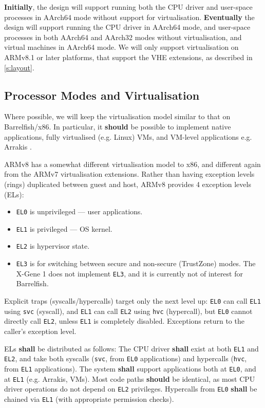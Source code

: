 \documentclass[a4paper,twoside]{report}
\begin{document}
\textbf{Initially}, the design will support running both the CPU driver and
user-space processes in AArch64 mode without support for virtualisation.
\textbf{Eventually} the design will support running the CPU driver in AArch64
mode, and user-space processes in both AArch64 and AArch32 modes without
virtualisation, and virtual machines in AArch64 mode. We will only support
virtualisation on ARMv8.1 or later platforms, that support the VHE extensions,
as described in \autoref{s:layout}.

\subsection{Processor Modes and Virtualisation}

Where possible, we will keep the virtualisation model similar to that on
Barrelfish/x86. In particular, it \textbf{should} be possible to implement
native applications, fully virtualised (e.g. Linux) VMs, and VM-level
applications e.g. Arrakis \citep{peter:osdi14}.

ARMv8 has a somewhat different virtualisation model to x86, and different
again from the ARMv7 virtualisation extensions. Rather than having exception
levels (rings) duplicated between guest and host, ARMv8 provides 4 exception
levels (ELs):

\begin{itemize}
\item \texttt{EL0} is unprivileged --- user applications.
\item \texttt{EL1} is privileged --- OS kernel.
\item \texttt{EL2} is hypervisor state.
\item \texttt{EL3} is for switching between secure and non-secure (TrustZone)
                   modes. The X-Gene 1 does not implement \texttt{EL3}, and it
                   is currently not of interest for Barrelfish.
\end{itemize}

Explicit traps (syscalls/hypercalls) target only the next level up:
\texttt{EL0} can call \texttt{EL1} using \texttt{svc} (syscall), and
\texttt{EL1} can call \texttt{EL2} using \texttt{hvc} (hypercall), but
\texttt{EL0} cannot directly call \texttt{EL2}, unless \texttt{EL1} is
completely disabled.  Exceptions return to the caller's exception level.

ELs \textbf{shall} be distributed as follows: The CPU driver \textbf{shall}
exist at both \texttt{EL1} and \texttt{EL2}, and take both syscalls
(\texttt{svc}, from \texttt{EL0} applications) and hypercalls (\texttt{hvc},
from \texttt{EL1} applications). The system \textbf{shall} support
applications both at \texttt{EL0}, and at \texttt{EL1} (e.g.  Arrakis, VMs).
Most code paths \textbf{should} be identical, as most CPU driver operations do
not depend on \texttt{EL2} privileges.  Hypercalls from \texttt{EL0}
\textbf{shall} be chained via \texttt{EL1} (with appropriate permission
checks).
\end{document}
